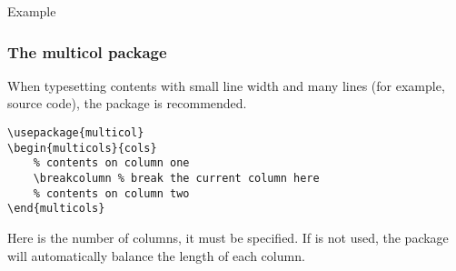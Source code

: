 \begin{frame}{Example}
    
\end{frame}

\begin{frame}[fragile]
    \frametitle{The multicol package}
    When typesetting contents with small line width and many lines (for example, source code), the  package is recommended.
    \begin{command}
        \begin{verbatim}
\usepackage{multicol}
\begin{multicols}{cols}
    % contents on column one
    \breakcolumn % break the current column here
    % contents on column two
\end{multicols}
		\end{verbatim}
    \end{command}
    Here  is the number of columns, it must be specified. If \LC{\breakcolumn} is not used, the  package will automatically balance the length of each column.
\end{frame}
